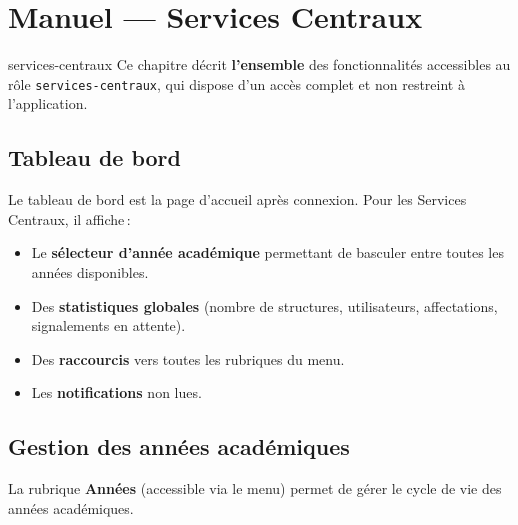 \chapter{Manuel --- Services Centraux}
\label{chap:sc}

\begin{rolebox}{services-centraux}
  Ce chapitre d\'ecrit \textbf{l'ensemble} des fonctionnalit\'es accessibles au r\^ole \texttt{services-centraux}, qui dispose d'un acc\`es complet et non restreint \`a l'application.
\end{rolebox}

\section{Tableau de bord}

Le tableau de bord est la page d'accueil apr\`es connexion. Pour les Services Centraux, il affiche\,:

\begin{itemize}
  \item Le \textbf{s\'electeur d'ann\'ee acad\'emique} permettant de basculer entre toutes les ann\'ees disponibles.
  \item Des \textbf{statistiques globales} (nombre de structures, utilisateurs, affectations, signalements en attente).
  \item Des \textbf{raccourcis} vers toutes les rubriques du menu.
  \item Les \textbf{notifications} non lues.
\end{itemize}


\section{Gestion des ann\'ees acad\'emiques}

La rubrique \textbf{Ann\'ees} (accessible via le menu) permet de g\'erer le cycle de vie des ann\'ees acad\'emiques.


